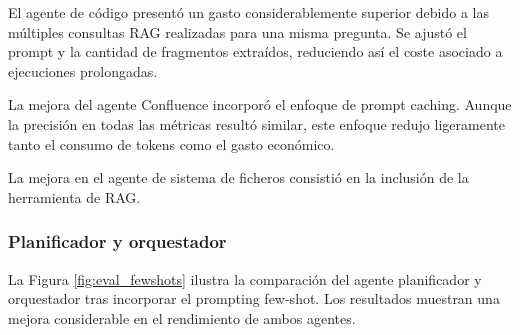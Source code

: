 El agente de código presentó un gasto considerablemente superior debido a las múltiples consultas RAG realizadas para una misma pregunta. Se ajustó el prompt y la cantidad de fragmentos extraídos, reduciendo así el coste asociado a ejecuciones prolongadas.

La mejora del agente Confluence incorporó el enfoque de prompt caching. Aunque la precisión en todas las métricas resultó similar, este enfoque redujo ligeramente tanto el consumo de tokens como el gasto económico.

La mejora en el agente de sistema de ficheros consistió en la inclusión de la herramienta de RAG.

\subsubsection{Planificador y orquestador}
La Figura \ref{fig:eval_fewshots} ilustra la comparación del agente planificador y orquestador tras incorporar el prompting few-shot. Los resultados muestran una mejora considerable en el rendimiento de ambos agentes.


